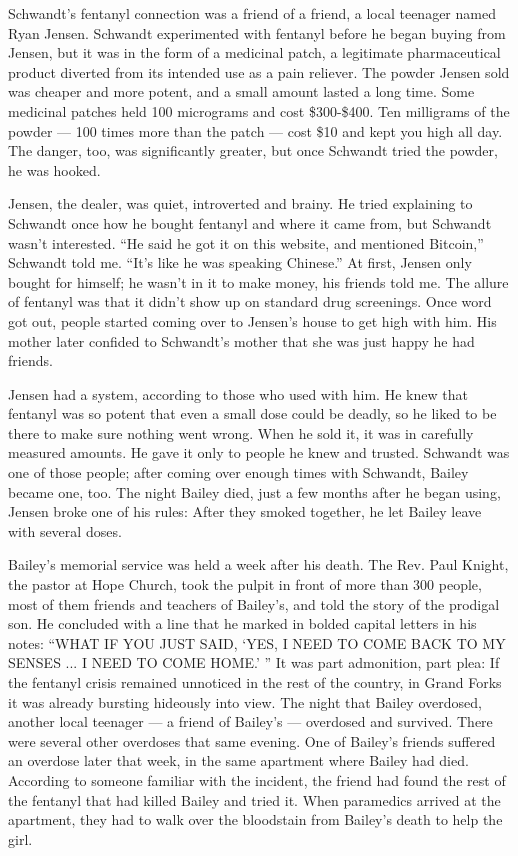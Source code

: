 Schwandt's fentanyl connection was a friend of a friend, a local
teenager named Ryan Jensen. Schwandt experimented with fentanyl before
he began buying from Jensen, but it was in the form of a medicinal
patch, a legitimate pharmaceutical product diverted from its intended
use as a pain reliever. The powder Jensen sold was cheaper and more
potent, and a small amount lasted a long time. Some medicinal patches
held 100 micrograms and cost \$300-\$400. Ten milligrams of the powder
--- 100 times more than the patch --- cost \$10 and kept you high all
day. The danger, too, was significantly greater, but once Schwandt tried
the powder, he was hooked.

Jensen, the dealer, was quiet, introverted and brainy. He tried
explaining to Schwandt once how he bought fentanyl and where it came
from, but Schwandt wasn't interested. ``He said he got it on this
website, and mentioned Bitcoin,'' Schwandt told me. ``It's like he was
speaking Chinese.'' At first, Jensen only bought for himself; he wasn't
in it to make money, his friends told me. The allure of fentanyl was
that it didn't show up on standard drug screenings. Once word got out,
people started coming over to Jensen's house to get high with him. His
mother later confided to Schwandt's mother that she was just happy he
had friends.

Jensen had a system, according to those who used with him. He knew that
fentanyl was so potent that even a small dose could be deadly, so he
liked to be there to make sure nothing went wrong. When he sold it, it
was in carefully measured amounts. He gave it only to people he knew and
trusted. Schwandt was one of those people; after coming over enough
times with Schwandt, Bailey became one, too. The night Bailey died, just
a few months after he began using, Jensen broke one of his rules: After
they smoked together, he let Bailey leave with several doses.

Bailey's memorial service was held a week after his death. The Rev. Paul
Knight, the pastor at Hope Church, took the pulpit in front of more than
300 people, most of them friends and teachers of Bailey's, and told the
story of the prodigal son. He concluded with a line that he marked in
bolded capital letters in his notes: ``WHAT IF YOU JUST SAID, `YES, I
NEED TO COME BACK TO MY SENSES ... I NEED TO COME HOME.' '' It was part
admonition, part plea: If the fentanyl crisis remained unnoticed in the
rest of the country, in Grand Forks it was already bursting hideously
into view. The night that Bailey overdosed, another local teenager --- a
friend of Bailey's --- overdosed and survived. There were several other
overdoses that same evening. One of Bailey's friends suffered an
overdose later that week, in the same apartment where Bailey had died.
According to someone familiar with the incident, the friend had found
the rest of the fentanyl that had killed Bailey and tried it. When
paramedics arrived at the apartment, they had to walk over the
bloodstain from Bailey's death to help the girl.

